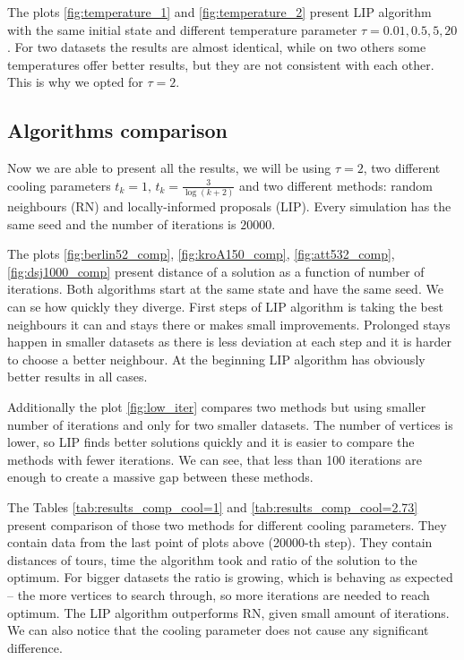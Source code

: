 	
	
	The plots \ref{fig:temperature_1} and \ref{fig:temperature_2} present LIP algorithm with the same initial state and different temperature parameter $\tau=0.01, 0.5, 5, 20$. For two datasets the results are almost identical, while on two others some temperatures offer better results, but they are not consistent with each other. This is why we opted for $\tau=2$.
	
\subsection{Algorithms comparison}
	Now we are able to present all the results, we will be using $\tau=2$, two different cooling parameters $t_k=1, \, t_k=\frac{3}{\log(k+2)}$ and two different methods: random neighbours (RN) and locally-informed proposals (LIP). Every simulation has the same seed and the number of iterations is $20000$.
	
	
	
	The plots \ref{fig:berlin52_comp}, \ref{fig:kroA150_comp}, \ref{fig:att532_comp}, \ref{fig:dsj1000_comp} present distance of a solution as a function of number of iterations. Both algorithms start at the same state and have the same seed. We can se how quickly they diverge. First steps of LIP algorithm is taking the best neighbours it can and stays there or makes small improvements. Prolonged stays happen in smaller datasets as there is less deviation at each step and it is harder to choose a better neighbour. At the beginning LIP algorithm has obviously better results in all cases.
	
	Additionally the plot \ref{fig:low_iter} compares two methods but using smaller number of iterations and only for two smaller datasets. The number of vertices is lower, so LIP finds better solutions quickly and it is easier to compare the methods with fewer iterations. We can see, that less than 100 iterations are enough to create a massive gap between these methods.
	
	
	
	The Tables \ref{tab:results_comp_cool=1} and \ref{tab:results_comp_cool=2.73} present comparison of those two methods for different cooling parameters. They contain data from the last point of plots above (20000-th step). They contain distances of tours, time the algorithm took and ratio of the solution to the optimum. For bigger datasets the ratio is growing, which is behaving as expected -- the more vertices to search through, so more iterations are needed to reach optimum. The LIP algorithm outperforms RN, given small amount of iterations. We can also notice that the cooling parameter does not cause any significant difference.
	
